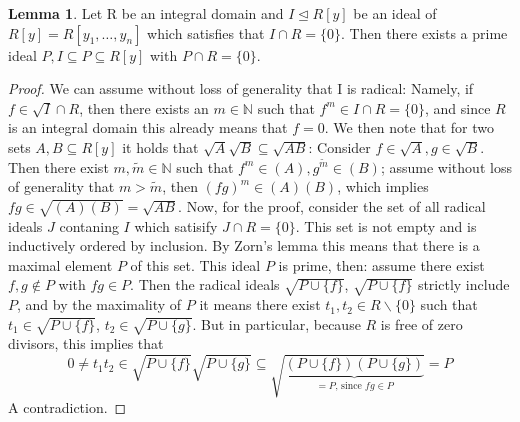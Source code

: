 \documentclass{article}
\def\N{\mathbb{N}}
\theoremstyle{definition}
\newtheorem{lem}[Satz]{Lemma}
\begin{document}
\begin{lem}\label{primeoverp1}
Let R be an integral domain and $I \unlhd R[y]$ be an ideal of $R[y] = R[y_1,\ldots,y_n]$ which satisfies that $I \cap R = \{ 0 \}$.
Then there exists a prime ideal $P, I \subseteq P \subseteq R[y] $ with $P \cap R = \{0\}$.
\begin{proof}
We can assume without loss of generality that I is radical:
Namely, if $f \in \sqrt{I} \cap R$, then there exists an $m \in \N$ such that $f^m \in I \cap R = \{0\}$, and since $R$ is an integral domain this already means that $f = 0$.
We then note that for two sets $A,B \subseteq R[y]$ it holds that $\sqrt{A}\sqrt{B} \subseteq \sqrt{AB}$: Consider $f \in \sqrt{A}, g \in \sqrt{B}$. Then there exist $m, \tilde m \in \N$ such that $f^m \in (A), g^{\tilde m} \in (B)$;
 assume without loss of generality that $m > \tilde m$, then $(fg)^m \in (A)(B)$, which implies $fg \in \sqrt{(A)(B)} = \sqrt{AB}$.
Now, for the proof, consider the set of all radical ideals $J$ contaning $I$ which satisify $J \cap R = \{0\}$. This set is not empty and is inductively ordered by inclusion.
By Zorn's lemma this means that there is a maximal element $P$ of this set. This ideal $P$ is prime, then: assume there exist $f,g \notin P$ with $fg \in P$. 
Then the radical ideals $\sqrt{P \cup \{f\}}$, $\sqrt{P \cup \{f\}}$ strictly include $P$, and by the maximality of $P$ it means there exist $t_1, t_2 \in R\backslash\{0\}$ such that
$t_1 \in \sqrt{P \cup \{f\}}$, $t_2 \in \sqrt{P \cup \{g\}}$. But in particular, because $R$ is free of zero divisors, this implies that
 \[0 \neq t_1t_2 \in \sqrt{P \cup \{f\}}\sqrt{P \cup \{g\}} \subseteq \sqrt{ \underbrace{(P \cup \{f\})(P \cup \{g\})}_{=P\text{, since }fg \in P}} = P\]
A contradiction.
\end{proof}
\end{lem}
\end{document}
